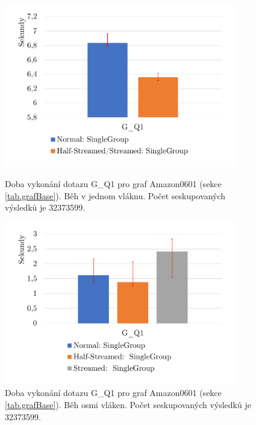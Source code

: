 \begin{figure}[!htp]
    \centering
    \begin{minipage}{0.45\textwidth}
        \centering
        \includegraphics[width=0.9\textwidth]{../img/amazonGroupByQ1ST.pdf} %
        \caption{Doba vykonání dotazu G\_Q1 pro graf Amazon0601 (sekce \ref{tab.grafBase}). Běh v jednom vláknu. Počet seskupovaných výsledků je 32373599.}
        \label{figure.amazonGQ1ST}
    \end{minipage}\hfill
    \begin{minipage}{0.45\textwidth}
        \centering
        \includegraphics[width=0.9\textwidth]{../img/amazonGroupByQ1Par.pdf} %
        \caption{Doba vykonání dotazu G\_Q1 pro graf Amazon0601 (sekce \ref{tab.grafBase}). Běh osmi vláken. Počet seskupovaných výsledků je 32373599.}
        \label{figure.amazonGQ1Par}
    \end{minipage}
\end{figure}

